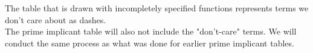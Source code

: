 \documentclass[nobib]{tufte-handout}
\begin{document}
\begin{mdframed}
\begin{center}
    \end{center}
\end{mdframed}
The table that is drawn with incompletely specified functions represents terms we don't care about as dashes.\\
The prime implicant table will also not include the "don't-care" terms. We will conduct the same process as what was done for earlier prime implicant tables.\\
\end{document}
